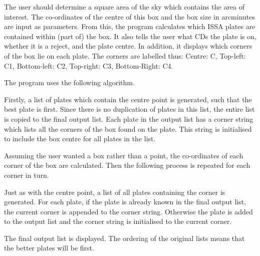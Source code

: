 \begin{small}
{{      The user should determine a square area of the sky which contains the
      area of interest. The co-ordinates of the centre of this box and
      the box size in arcminutes are input as parameters.
      From this, the program calculates
      which ISSA plates are contained within (part of) the box. It
      also tells the user what CDs the plate is on, whether it is a
      reject, and the plate centre.
      In addition, it displays which corners of the box lie on each plate.
      The corners are labelled thus:
      Centre: C, Top-left: C1, Bottom-left: C2, Top-right: C3,
      Bottom-Right: C4.

      The program uses the following algorithm.

      Firstly, a list of plates which contain the centre point is generated,
      such that the best plate is first. Since there is no duplication of
      plates in this list, the entire list is copied to the final output
      list. Each plate in the output list has a corner string which lists
      all the corners of the box found on the plate. This string is initialised
      to include the box centre for all plates in the list.

      Assuming the user wanted a box rather than a point, the
      co-ordinates of each corner of the box are calculated. Then the
      following process is repeated for each corner in turn.

      Just as with the centre point, a list of all plates containing the
      corner is generated. For each plate, if the plate is already known
      in the final output list, the current corner is appended to the corner
      string. Otherwise the plate is added to the output list and the corner
      string is initialised to the current corner.

      The final output list is displayed. The ordering of the original lists
      means that the better plates will be first.
   }
}


\end{small}
